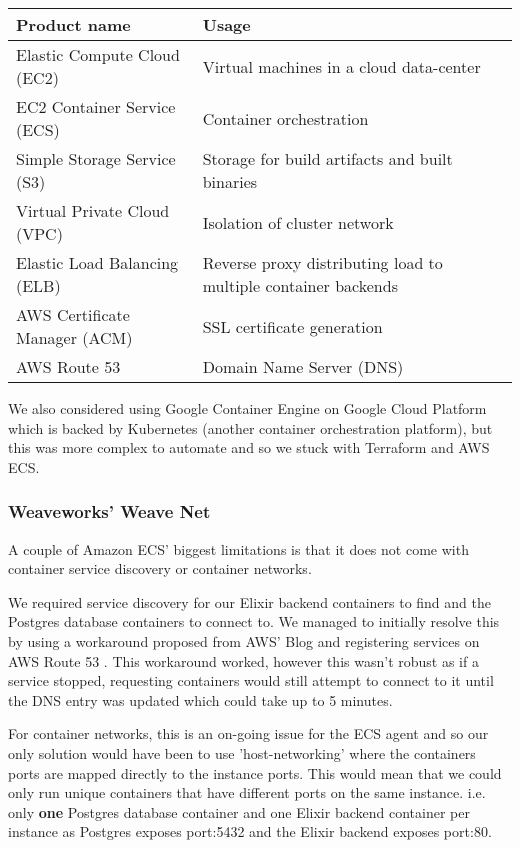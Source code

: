 \documentclass[11pt,a4paper]{report}
\begin{document}
\begin{tabular}{ | l | p{6cm} |}
  \hline
  Product name & Usage \\
  \hline
  Elastic Compute Cloud (EC2) & Virtual machines in a cloud data-center\\
  EC2 Container Service (ECS) & Container orchestration \\
  Simple Storage Service (S3) & Storage for build artifacts and built binaries \\
  Virtual Private Cloud (VPC) & Isolation of cluster network\\
  Elastic Load Balancing (ELB) & Reverse proxy distributing load to multiple container backends\\
  AWS Certificate Manager (ACM) & SSL certificate generation\\
  AWS Route 53 & Domain Name Server (DNS)\\
  \hline
\end{tabular}

We also considered using Google Container Engine on Google Cloud Platform which is backed by Kubernetes (another container orchestration platform), but this was more complex to automate and so we stuck with Terraform and AWS ECS.

\subsubsection{Weaveworks' Weave Net}

A couple of Amazon ECS' biggest limitations is that it does not come with container service discovery or container networks.

We required service discovery for our Elixir backend containers to find and the Postgres database containers to connect to. We managed to initially resolve this by using a workaround proposed from AWS' Blog and registering services on AWS Route 53 \cite{website:aws_ecs_dns}. This workaround worked, however this wasn't robust as if a service stopped, requesting containers would still attempt to connect to it until the DNS entry was updated which could take up to 5 minutes.

For container networks, this is an on-going issue for the ECS agent \cite{website:github_user_network_issue} and so our only solution would have been to use 'host-networking' where the containers ports are mapped directly to the instance ports. This would mean that we could only run unique containers that have different ports on the same instance. i.e. only \textbf{one} Postgres database container and one Elixir backend container per instance as Postgres exposes port:5432 and the Elixir backend exposes port:80.
\end{document}
